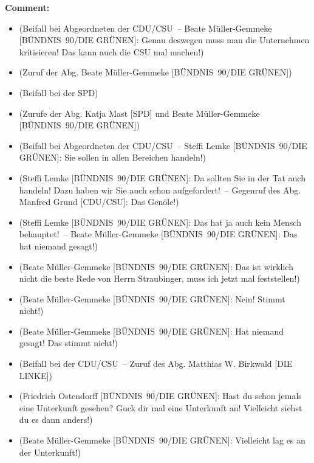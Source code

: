 \documentclass{article}
\begin{document}
\noindent\textbf{Comment:}
\begin{itemize}
    \setlength\itemsep{-3pt}
    \item (Beifall bei Abgeordneten der CDU/CSU – Beate Müller-Gemmeke [BÜNDNIS 90/DIE GRÜNEN]: Genau deswegen muss man die Unternehmen kritisieren! Das kann auch die CSU mal machen!)
    \setlength\itemsep{-3pt}
    \item (Zuruf der Abg. Beate Müller-Gemmeke [BÜNDNIS 90/DIE GRÜNEN])
    \setlength\itemsep{-3pt}
    \item (Beifall bei der SPD)
    \setlength\itemsep{-3pt}
    \item (Zurufe der Abg. Katja Mast [SPD] und Beate Müller-Gemmeke [BÜNDNIS 90/DIE GRÜNEN])
    \setlength\itemsep{-3pt}
    \item (Beifall bei Abgeordneten der CDU/CSU – Steffi Lemke [BÜNDNIS 90/DIE GRÜNEN]: Sie sollen in allen Bereichen handeln!)
    \setlength\itemsep{-3pt}
    \item (Steffi Lemke [BÜNDNIS 90/DIE GRÜNEN]: Da sollten Sie in der Tat auch handeln! Dazu haben wir Sie auch schon aufgefordert! – Gegenruf des Abg. Manfred Grund [CDU/CSU]: Das Genöle!)
    \setlength\itemsep{-3pt}
    \item (Steffi Lemke [BÜNDNIS 90/DIE GRÜNEN]: Das hat ja auch kein Mensch behauptet! – Beate Müller-Gemmeke [BÜNDNIS 90/DIE GRÜNEN]: Das hat niemand gesagt!)
    \setlength\itemsep{-3pt}
    \item (Beate Müller-Gemmeke [BÜNDNIS 90/DIE GRÜNEN]: Das ist wirklich nicht die beste Rede von Herrn Straubinger, muss ich jetzt mal feststellen!)
    \setlength\itemsep{-3pt}
    \item (Beate Müller-Gemmeke [BÜNDNIS 90/DIE GRÜNEN]: Nein! Stimmt nicht!)
    \setlength\itemsep{-3pt}
    \item (Beate Müller-Gemmeke [BÜNDNIS 90/DIE GRÜNEN]: Hat niemand gesagt! Das stimmt nicht!)
    \setlength\itemsep{-3pt}
    \item (Beifall bei der CDU/CSU – Zuruf des Abg. Matthias W. Birkwald [DIE LINKE])
    \setlength\itemsep{-3pt}
    \item (Friedrich Ostendorff [BÜNDNIS 90/DIE GRÜNEN]: Hast du schon jemals eine Unterkunft gesehen? Guck dir mal eine Unterkunft an! Vielleicht siehst du es dann anders!)
    \setlength\itemsep{-3pt}
    \item (Beate Müller-Gemmeke [BÜNDNIS 90/DIE GRÜNEN]: Vielleicht lag es an der Unterkunft!)
\end{itemize}
\end{document}
